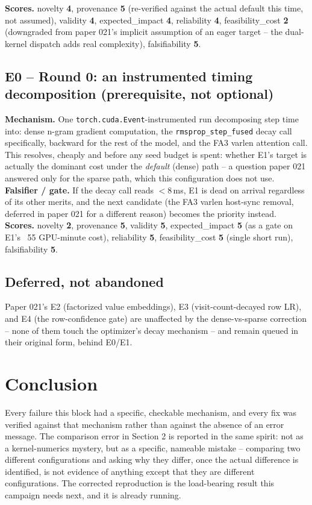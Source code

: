 \documentclass{article}
\begin{document}
\textbf{Scores.} novelty \textbf{4}, provenance \textbf{5} (re-verified against the actual default this time, not assumed), validity \textbf{4}, expected\_impact \textbf{4}, reliability \textbf{4}, feasibility\_cost \textbf{2} (downgraded from paper 021's implicit assumption of an eager target -- the dual-kernel dispatch adds real complexity), falsifiability \textbf{5}.

\subsection{E0 -- Round 0: an instrumented timing decomposition (prerequisite, not optional)}
\textbf{Mechanism.} One \texttt{torch.cuda.Event}-instrumented run decomposing step time into: dense n-gram gradient computation, the \texttt{rmsprop\_step\_fused} decay call specifically, backward for the rest of the model, and the FA3 varlen attention call. This resolves, cheaply and before any seed budget is spent: whether E1's target is actually the dominant cost under the \emph{default} (dense) path -- a question paper 021 answered only for the sparse path, which this configuration does not use.
\textbf{Falsifier / gate.} If the decay call reads $<$8\,ms, E1 is dead on arrival regardless of its other merits, and the next candidate (the FA3 varlen host-sync removal, deferred in paper 021 for a different reason) becomes the priority instead.
\textbf{Scores.} novelty \textbf{2}, provenance \textbf{5}, validity \textbf{5}, expected\_impact \textbf{5} (as a gate on E1's ~55 GPU-minute cost), reliability \textbf{5}, feasibility\_cost \textbf{5} (single short run), falsifiability \textbf{5}.

\subsection{Deferred, not abandoned}
Paper 021's E2 (factorized value embeddings), E3 (visit-count-decayed row LR), and E4 (the row-confidence gate) are unaffected by the dense-vs-sparse correction -- none of them touch the optimizer's decay mechanism -- and remain queued in their original form, behind E0/E1.

\section{Conclusion}
Every failure this block had a specific, checkable mechanism, and every fix was verified against that mechanism rather than against the absence of an error message. The comparison error in Section 2 is reported in the same spirit: not as a kernel-numerics mystery, but as a specific, nameable mistake -- comparing two different configurations and asking why they differ, once the actual difference is identified, is not evidence of anything except that they are different configurations. The corrected reproduction is the load-bearing result this campaign needs next, and it is already running.
\end{document}
